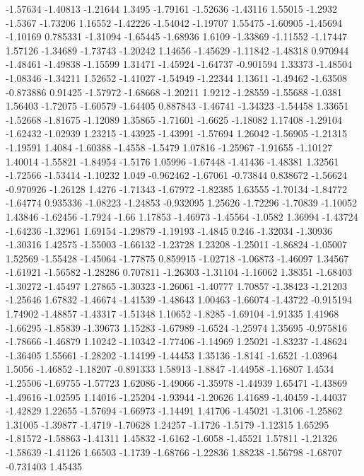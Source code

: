 \documentclass[9pt]{article}
\theoremstyle{plain}
\theoremstyle{definition}
\theoremstyle{remark}
\numberwithin{equation}{section}
\begin{document}
-1.57634
-1.40813
-1.21644
1.3495
-1.79161
-1.52636
-1.43116
1.55015
-1.2932
-1.5367
-1.73206
1.16552
-1.42226
-1.54042
-1.19707
1.55475
-1.60905
-1.45694
-1.10169
0.785331
-1.31094
-1.65445
-1.68936
1.6109
-1.33869
-1.11552
-1.17447
1.57126
-1.34689
-1.73743
-1.20242
1.14656
-1.45629
-1.11842
-1.48318
0.970944
-1.48461
-1.49838
-1.15599
1.31471
-1.45924
-1.64737
-0.901594
1.33373
-1.48504
-1.08346
-1.34211
1.52652
-1.41027
-1.54949
-1.22344
1.13611
-1.49462
-1.63508
-0.873886
0.91425
-1.57972
-1.68668
-1.20211
1.9212
-1.28559
-1.55688
-1.0381
1.56403
-1.72075
-1.60579
-1.64405
0.887843
-1.46741
-1.34323
-1.54458
1.33651
-1.52668
-1.81675
-1.12089
1.35865
-1.71601
-1.6625
-1.18082
1.17408
-1.29104
-1.62432
-1.02939
1.23215
-1.43925
-1.43991
-1.57694
1.26042
-1.56905
-1.21315
-1.19591
1.4084
-1.60388
-1.4558
-1.5479
1.07816
-1.25967
-1.91655
-1.10127
1.40014
-1.55821
-1.84954
-1.5176
1.05996
-1.67448
-1.41436
-1.48381
1.32561
-1.72566
-1.53414
-1.10232
1.049
-0.962462
-1.67061
-0.73844
0.838672
-1.56624
-0.970926
-1.26128
1.4276
-1.71343
-1.67972
-1.82385
1.63555
-1.70134
-1.84772
-1.64774
0.935336
-1.08223
-1.24853
-0.932095
1.25626
-1.72296
-1.70839
-1.10052
1.43846
-1.62456
-1.7924
-1.66
1.17853
-1.46973
-1.45564
-1.0582
1.36994
-1.43724
-1.64236
-1.32961
1.69154
-1.29879
-1.19193
-1.4845
0.246
-1.32034
-1.30936
-1.30316
1.42575
-1.55003
-1.66132
-1.23728
1.23208
-1.25011
-1.86824
-1.05007
1.52569
-1.55428
-1.45064
-1.77875
0.859915
-1.02718
-1.06873
-1.46097
1.34567
-1.61921
-1.56582
-1.28286
0.707811
-1.26303
-1.31104
-1.16062
1.38351
-1.68403
-1.30272
-1.45497
1.27865
-1.30323
-1.26061
-1.40777
1.70857
-1.38423
-1.21203
-1.25646
1.67832
-1.46674
-1.41539
-1.48643
1.00463
-1.66074
-1.43722
-0.915194
1.74902
-1.48857
-1.43317
-1.51348
1.10652
-1.8285
-1.69104
-1.91335
1.41968
-1.66295
-1.85839
-1.39673
1.15283
-1.67989
-1.6524
-1.25974
1.35695
-0.975816
-1.78666
-1.46879
1.10242
-1.10342
-1.77406
-1.14969
1.25021
-1.83237
-1.48624
-1.36405
1.55661
-1.28202
-1.14199
-1.44453
1.35136
-1.8141
-1.6521
-1.03964
1.5056
-1.46852
-1.18207
-0.891333
1.58913
-1.8847
-1.44958
-1.16807
1.4534
-1.25506
-1.69755
-1.57723
1.62086
-1.49066
-1.35978
-1.44939
1.65471
-1.43869
-1.49616
-1.02595
1.14016
-1.25204
-1.93944
-1.20626
1.41689
-1.40459
-1.44037
-1.42829
1.22655
-1.57694
-1.66973
-1.14491
1.41706
-1.45021
-1.3106
-1.25862
1.31005
-1.39877
-1.4719
-1.70628
1.24257
-1.1726
-1.5179
-1.12315
1.65295
-1.81572
-1.58863
-1.41311
1.45832
-1.6162
-1.6058
-1.45521
1.57811
-1.21326
-1.58639
-1.41126
1.66503
-1.1739
-1.68766
-1.22836
1.88238
-1.56798
-1.68707
-0.731403
1.45435
\end{document}
